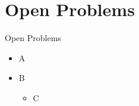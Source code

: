 \section{Open Problems}

\begin{frame}{Open Problems}
  \begin{itemize}
    \item A
    \item B
      \begin{itemize}
        \item C
      \end{itemize}
  \end{itemize}
\end{frame}
